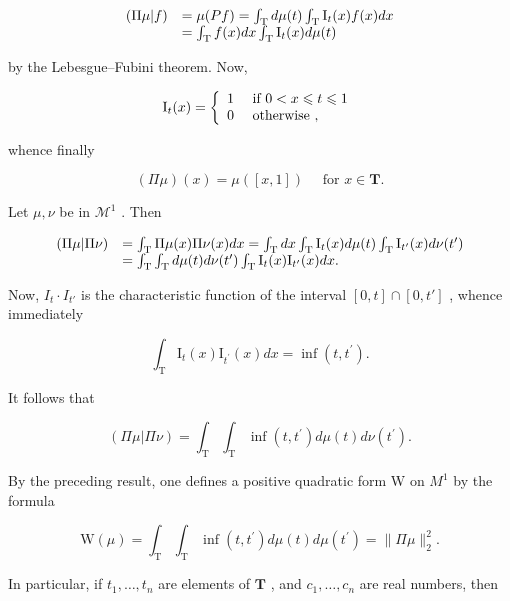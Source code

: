 \[
\begin{array}{r l} (\Pi \mu | f) & = \mu (P f) = \int_ {\mathrm{T}} d \mu (t) \int_ {\mathrm{T}} \mathrm{I} _ {t} (x) f (x) d x \\ & = \int_ {\mathrm{T}} f (x) d x \int_ {\mathrm{T}} \mathrm{I} _ {t} (x) d \mu (t) \end{array}
\]

by the Lebesgue--Fubini theorem. Now,

\[
\mathrm{I} _ {t} (x) = \left\{ \begin{array}{l l} 1 & \text { if } 0 <   x \leqslant t \leqslant 1 \\ 0 & \text { otherwise }, \end{array} \right.
\]

whence finally

\[
(\Pi \mu) (x) = \mu ([ x, 1 ]) \quad \text { for } x \in \mathbf {T}.\tag{34}
\]

Let \(\mu, \nu\) be in \(\mathcal{M}^1\) . Then

\[
\begin{array}{r l} (\Pi \mu | \Pi \nu) & = \int_ {\mathrm{T}} \Pi \mu (x) \Pi \nu (x) d x = \int_ {\mathrm{T}} d x \int_ {\mathrm{T}} \mathrm{I} _ {t} (x) d \mu (t) \int_ {\mathrm{T}} \mathrm{I} _ {t ^ {\prime}} (x) d \nu (t ^ {\prime}) \\ & = \int_ {\mathrm{T}} \int_ {\mathrm{T}} d \mu (t) d \nu (t ^ {\prime}) \int_ {\mathrm{T}} \mathrm{I} _ {t} (x) \mathrm{I} _ {t ^ {\prime}} (x) d x. \end{array}
\]

Now, \(I_{t} \cdot I_{t'}\) is the characteristic function of the interval \([0, t] \cap [0, t']\) , whence immediately

\[
\int_ {\mathrm{T}} \mathrm{I} _ {t} (x) \mathrm{I} _ {t ^ {\prime}} (x) d x = \inf (t, t ^ {\prime}).\tag{35}
\]

It follows that

\[
(\Pi \mu | \Pi \nu) = \int_ {\mathrm{T}} \int_ {\mathrm{T}} \inf (t, t ^ {\prime}) d \mu (t) d \nu (t ^ {\prime}).\tag{36}
\]

By the preceding result, one defines a positive quadratic form W on \(M^{1}\) by the formula

\[
\mathrm{W} (\mu) = \int_ {\mathrm{T}} \int_ {\mathrm{T}} \inf (t, t ^ {\prime}) d \mu (t) d \mu (t ^ {\prime}) = \| \Pi \mu \| _ {2} ^ {2}.\tag{37}
\]

In particular, if \(t_1, \ldots, t_n\) are elements of \(\mathbf{T}\) , and \(c_1, \ldots, c_n\) are real numbers, then

